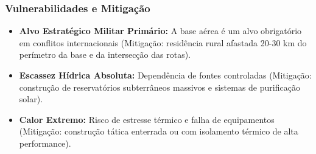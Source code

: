 \subsubsection{Vulnerabilidades e
Mitigação}

\begin{itemize}
\tightlist
\item
  \textbf{Alvo Estratégico Militar Primário:} A base aérea é um alvo
  obrigatório em conflitos internacionais (Mitigação: residência rural
  afastada 20-30 km do perímetro da base e da intersecção das rotas).
\item
  \textbf{Escassez Hídrica Absoluta:} Dependência de fontes controladas
  (Mitigação: construção de reservatórios subterrâneos massivos e
  sistemas de purificação solar).
\item
  \textbf{Calor Extremo:} Risco de estresse térmico e falha de
  equipamentos (Mitigação: construção tática enterrada ou com isolamento
  térmico de alta performance).
\end{itemize}

